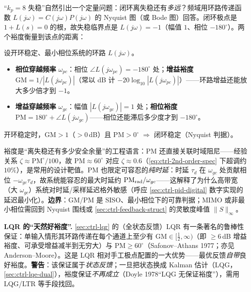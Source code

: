 “$k_p=8$ 失稳”自然引出一个定量问题：闭环离失稳还有\emph{多远}？频域用环路传递函数 $L(j\omega)=C(j\omega)P(j\omega)$ 的 Nyquist 图（或 Bode 图）回答。闭环极点是 $1+L(s)=0$ 的根，故失稳临界点是 $L(j\omega)=-1$（幅值 $1$、相位 $-180^\circ$）。两个裕度衡量到该点的距离\cite{astrom2008feedback}：

\begin{definition}[增益裕度与相位裕度]
\label{def:ctrl-margins}
设开环稳定、最小相位系统的环路 $L(j\omega)$。
\begin{itemize}
  \item \textbf{相位穿越频率} $\omega_{pc}$：相位 $\angle L(j\omega_{pc})=-180^\circ$ 处；\textbf{增益裕度} $\mathrm{GM}=1/|L(j\omega_{pc})|$（常以 dB 计 $-20\log_{10}|L(j\omega_{pc})|$）——环路增益还能放大多少倍才到 $-1$。
  \item \textbf{增益穿越频率} $\omega_{gc}$：幅值 $|L(j\omega_{gc})|=1$ 处；\textbf{相位裕度} $\mathrm{PM}=180^\circ+\angle L(j\omega_{gc})$——相位还能滞后多少度才到 $-180^\circ$。
\end{itemize}
开环稳定时，$\mathrm{GM}>1$（$>0$\,dB）且 $\mathrm{PM}>0^\circ$ $\Rightarrow$ 闭环稳定（Nyquist 判据）。
\end{definition}

\begin{insight}
裕度是“离失稳还有多少安全余量”的工程语言：$\mathrm{PM}$ 还直接关联时域阻尼——经验关系 $\zeta\approx\mathrm{PM}^\circ/100$，故 $\mathrm{PM}\approx60^\circ$ 对应 $\zeta\approx0.6$（\cref{eq:ctrl-2nd-order-spec} 下超调约 $10\%$），是常用的设计靶值。$\mathrm{PM}$ 也限定可容忍的\emph{纯时延}：时延 $\tau_d$ 在 $\omega_{gc}$ 处贡献相位 $-\omega_{gc}\tau_d$，故系统能容忍的最大时延约 $\mathrm{PM}_{\rm rad}/\omega_{gc}$——这解释了为什么高带宽（大 $\omega_{gc}$）系统对时延/采样延迟格外敏感（呼应 \cref{sec:ctrl-pid-digital} 数字实现的延迟最小化）。\textbf{边界}：GM/PM 是 SISO、最小相位下的可靠判据；MIMO 或非最小相位需回到 Nyquist 围线或 \cref{sec:ctrl-feedback-struct} 的灵敏度峰值 $\|S\|_\infty$。
\end{insight}

\begin{note}
\textbf{LQR 的“天然好裕度”.}\;
\cref{sec:ctrl-lqr} 的（全状态反馈）LQR 有一条著名的鲁棒性保证：单输入情形其环路传递在每个通道上至少有 $\mathrm{GM}\in[\tfrac12,\infty)$（即 $\ge6$\,dB 增益裕度、可承受增益减半到无穷大）与 $\mathrm{PM}\ge60^\circ$（Safonov--Athans 1977；亦见 Anderson--Moore\cite{tedrake_underactuated,rawlings2020mpc}）。这是 LQR 相对手工极点配置的一大优势——最优反馈\emph{自带}良好裕度。\textbf{警告}：该保证属于\emph{状态反馈}；一旦把状态换成 Kalman 估计（LQG，\cref{sec:ctrl-lqe-dual}），裕度保证\emph{不再成立}（Doyle 1978“LQG 无保证裕度”），需用 LQG/LTR 等手段找回。
\end{note}

